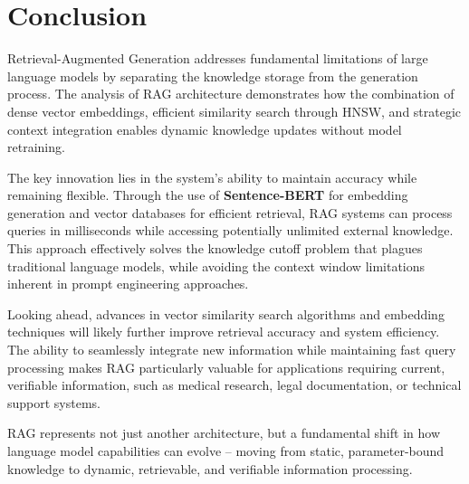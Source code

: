 \documentclass[12pt]{article}
\begin{document}
    \pagebreak
    \section{Conclusion}
    Retrieval-Augmented Generation addresses fundamental limitations of large language models by separating the 
    knowledge storage from the generation process. The analysis of RAG architecture demonstrates how the combination
    of dense vector embeddings, efficient similarity search through HNSW, and strategic context integration enables 
    dynamic knowledge updates without model retraining.
    
    The key innovation lies in the system's ability to maintain accuracy while remaining flexible. Through the use of 
    \textbf{Sentence-BERT} for embedding generation and vector databases for efficient retrieval, RAG systems can process
    queries in milliseconds while accessing potentially unlimited external knowledge. This approach effectively solves the 
    knowledge cutoff problem that plagues traditional language models, while avoiding the context window limitations 
    inherent in prompt engineering approaches.
    
    Looking ahead, advances in vector similarity search algorithms and embedding techniques will likely further improve 
    retrieval accuracy and system efficiency. The ability to seamlessly integrate new information while maintaining fast 
    query processing makes RAG particularly valuable for applications requiring current, verifiable information, such as 
    medical research, legal documentation, or technical support systems.
    
    RAG represents not just another architecture, but a fundamental shift in how language model capabilities can 
    evolve – moving from static, parameter-bound knowledge to dynamic, retrievable, and verifiable information processing.

    \newpage
    \printbibliography[title={References}]
\end{document}
